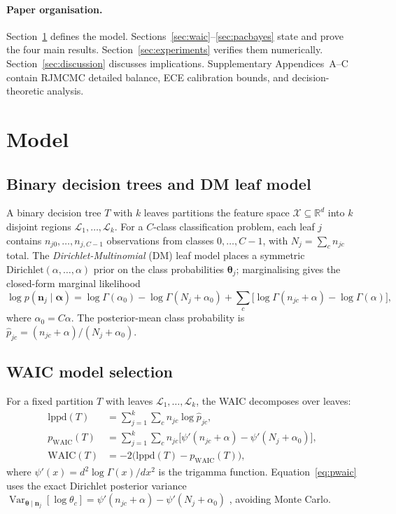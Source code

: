 \documentclass[ba]{imsart}
\theoremstyle{plain}
\theoremstyle{definition}
\theoremstyle{remark}
\newcommand{\bfn}{\boldsymbol{n}}
\newcommand{\bfal}{\boldsymbol{\alpha}}
\newcommand{\waic}{\mathrm{WAIC}}
\newcommand{\lppd}{\mathrm{lppd}}
\begin{document}
\paragraph{Paper organisation.}
Section~\ref{sec:model} defines the model.
Sections~\ref{sec:waic}--\ref{sec:pacbayes} state and prove the four main results.
Section~\ref{sec:experiments} verifies them numerically.
Section~\ref{sec:discussion} discusses implications.
Supplementary Appendices~A--C contain RJMCMC detailed balance, ECE calibration bounds,
and decision-theoretic analysis.

\section{Model}
\label{sec:model}

\subsection{Binary decision trees and DM leaf model}

A binary decision tree $T$ with $k$ leaves partitions the feature space
$\mathcal{X} \subseteq \mathbb{R}^d$ into $k$ disjoint regions
$\mathcal{L}_1,\ldots,\mathcal{L}_k$.
For a $C$-class classification problem, each leaf $j$ contains
$n_{j0},\ldots,n_{j,C-1}$ observations from classes $0,\ldots,C-1$,
with $N_j = \sum_c n_{jc}$ total.
The \emph{Dirichlet-Multinomial} (DM) leaf model places a symmetric
$\mathrm{Dirichlet}(\alpha,\ldots,\alpha)$ prior on the class probabilities
$\boldsymbol{\theta}_j$; marginalising gives the closed-form marginal likelihood
\begin{equation}
  \log p(\bfn_j \mid \bfal) = \log\Gamma(\alpha_0) - \log\Gamma(N_j+\alpha_0)
  + \sum_c \bigl[\log\Gamma(n_{jc}+\alpha) - \log\Gamma(\alpha)\bigr],
  \label{eq:dm_ml}
\end{equation}
where $\alpha_0 = C\alpha$.
The posterior-mean class probability is $\hat{p}_{jc} = (n_{jc}+\alpha)/(N_j+\alpha_0)$.

\subsection{WAIC model selection}

For a fixed partition $T$ with leaves $\mathcal{L}_1,\ldots,\mathcal{L}_k$,
the WAIC \citep{watanabe2010} decomposes over leaves:
\begin{align}
  \lppd(T) &= \sum_{j=1}^k \sum_c n_{jc} \log \hat{p}_{jc},
  \label{eq:lppd} \\
  p_{\waic}(T) &= \sum_{j=1}^k \sum_c n_{jc}
    \bigl[\psi'(n_{jc}+\alpha) - \psi'(N_j+\alpha_0)\bigr],
  \label{eq:pwaic} \\
  \waic(T) &= -2\bigl(\lppd(T) - p_{\waic}(T)\bigr),
  \label{eq:waic}
\end{align}
where $\psi'(x) = d^2\log\Gamma(x)/dx^2$ is the trigamma function.
Equation~\eqref{eq:pwaic} uses the exact Dirichlet posterior variance
$\operatorname{Var}_{\boldsymbol{\theta}\mid\bfn_j}[\log\theta_c]
= \psi'(n_{jc}+\alpha) - \psi'(N_j+\alpha_0)$ \citep{gelman2014},
avoiding Monte Carlo.
\end{document}
